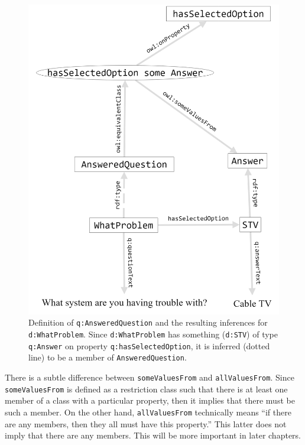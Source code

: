 \begin{figure}
\centering
\includegraphics[width=5in]{SWWOv3/media/ch12/figure12-3.png}
\caption{Definition of \texttt{q:AnsweredQuestion} and the resulting inferences for
\texttt{d:WhatProblem}. Since \texttt{d:WhatProblem} has something (\texttt{d:STV}) of type
\texttt{q:Answer} on property \texttt{q:hasSelectedOption}, it is inferred (dotted line)
to be a member of \texttt{AnsweredQuestion}.
}
\label{fig:ch12.03}
\end{figure}





There is a subtle difference between \texttt{someValuesFrom} and \texttt{allValuesFrom}.
Since
\texttt{someValuesFrom} is defined as a restriction class such that there is at
least one member of a class with a particular property, then it implies
that there must be such a member. On the other hand, \texttt{allValuesFrom}
technically means ``if there are any members, then they all must have
this property.'' This latter does not imply that there are any members.
This will be more important in later chapters.

